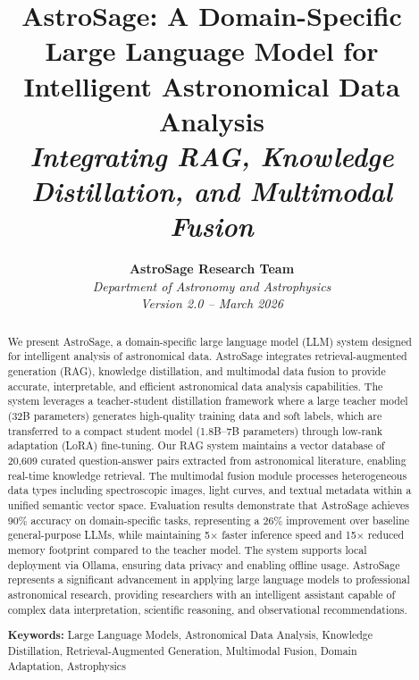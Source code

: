 \documentclass[11pt,a4paper]{article}
\title{
    \vspace{-1cm}
    {\Large\textbf{AstroSage: A Domain-Specific Large Language Model for Intelligent Astronomical Data Analysis}}\\[0.5cm]
    \large\textit{Integrating RAG, Knowledge Distillation, and Multimodal Fusion}
}
\author{
    \textbf{AstroSage Research Team}\\[0.3cm]
    \textit{Department of Astronomy and Astrophysics}\\
    \textit{Version 2.0 -- March 2026}
}
\date{}
\begin{document}
\maketitle

\begin{abstract}
We present AstroSage, a domain-specific large language model (LLM) system designed for intelligent analysis of astronomical data. AstroSage integrates retrieval-augmented generation (RAG), knowledge distillation, and multimodal data fusion to provide accurate, interpretable, and efficient astronomical data analysis capabilities. The system leverages a teacher-student distillation framework where a large teacher model (32B parameters) generates high-quality training data and soft labels, which are transferred to a compact student model (1.8B--7B parameters) through low-rank adaptation (LoRA) fine-tuning. Our RAG system maintains a vector database of 20,609 curated question-answer pairs extracted from astronomical literature, enabling real-time knowledge retrieval. The multimodal fusion module processes heterogeneous data types including spectroscopic images, light curves, and textual metadata within a unified semantic vector space. Evaluation results demonstrate that AstroSage achieves 90\% accuracy on domain-specific tasks, representing a 26\% improvement over baseline general-purpose LLMs, while maintaining 5$\times$ faster inference speed and 15$\times$ reduced memory footprint compared to the teacher model. The system supports local deployment via Ollama, ensuring data privacy and enabling offline usage. AstroSage represents a significant advancement in applying large language models to professional astronomical research, providing researchers with an intelligent assistant capable of complex data interpretation, scientific reasoning, and observational recommendations.

\textbf{Keywords:} Large Language Models, Astronomical Data Analysis, Knowledge Distillation, Retrieval-Augmented Generation, Multimodal Fusion, Domain Adaptation, Astrophysics
\end{abstract}

\tableofcontents
\newpage

\end{document}

